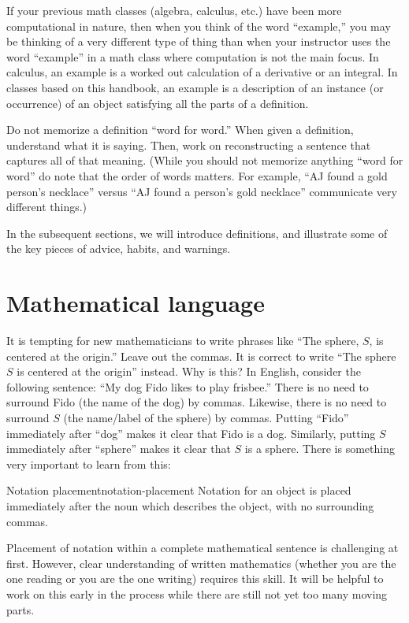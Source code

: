 \documentclass{book}
\theoremstyle{ekimcustom}
\begin{document}
If your previous math classes (algebra, calculus, etc.) have been more computational in nature, then when you think of the word ``example,'' you may be thinking of a very different type of thing than when your instructor uses the word ``example'' in a math class where computation is not the main focus. In calculus, an example is a worked out calculation of a derivative or an integral. In classes based on this handbook, an example is a description of an instance (or occurrence) of an object satisfying all the parts of a definition.

Do not memorize a definition ``word for word.'' When given a definition, understand what it is saying. Then, work on reconstructing a sentence that captures all of that meaning. (While you should not memorize anything ``word for word'' do note that the order of words matters. For example, ``AJ found a gold person's necklace'' versus ``AJ found a person's gold necklace'' communicate very different things.)

In the subsequent sections, we will introduce definitions, and illustrate some of the key pieces of advice, habits, and warnings. 



\section{Mathematical language}

It is tempting for new mathematicians to write phrases like ``The sphere, $S$, is centered at the origin.'' Leave out the commas. It is correct to write ``The sphere $S$ is centered at the origin'' instead. Why is this? In English, consider the following sentence: ``My dog Fido likes to play frisbee.''  There is no need to surround Fido (the name of the dog) by commas. Likewise, there is no need to surround $S$ (the name/label of the sphere) by commas. Putting ``Fido'' immediately after ``dog'' makes it clear that Fido is a dog. Similarly, putting $S$ immediately after ``sphere'' makes it clear that $S$ is a sphere. There is something very important to learn from this:
\begin{blanguage}{Notation placement}{notation-placement}
Notation for an object is placed immediately after the noun which describes the object, with no surrounding commas.
\end{blanguage}

Placement of notation within a complete mathematical sentence is challenging at first. However, clear understanding of written mathematics (whether you are the one reading or you are the one writing) requires this skill. It will be helpful to work on this early in the process while there are still not yet too many moving parts.
\end{document}
